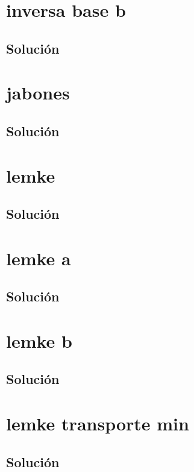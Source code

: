 \documentclass[a4paper,10pt,onecolumn]{report}
\begin{document}
\section{inversa base b}

\subsection*{Solución}

\clearpage
\section{jabones}

\subsection*{Solución}

\clearpage
\section{lemke}

\subsection*{Solución}

\clearpage
\section{lemke a}

\subsection*{Solución}

\clearpage
\section{lemke b}

\subsection*{Solución}

\clearpage
\section{lemke transporte min}

\subsection*{Solución}

\clearpage
\end{document}
